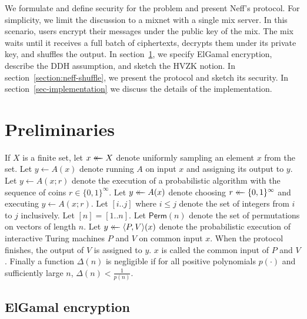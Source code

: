\documentclass[letter]{article}
\newcommand{\bits}{\{0,1\}}
\newcommand{\getsr}{\mathrel{\leftarrow\mkern-14mu\leftarrow}}
\newcommand{\brackets}[1]{\langle #1 \rangle}
\newcommand{\Perm}{\textsf{Perm}}
\begin{document}
We formulate and define security for the problem and present Neff's protocol.
For simplicity, we limit the discussion to a mixnet with a single mix server. In
this scenario, users encrypt their messages under the public key of the mix. The
mix waits until it receives a full batch of ciphertexts, decrypts them under its
private key, and shuffles the output. In section~\ref{section:prelim}, we specify
ElGamal encryption, describe the DDH assumption, and sketch the HVZK notion. In
section~\ref{section:neff-shuffle}, we present the protocol and sketch its
security. In section~\ref{sec-implementation} we discuss the details of the
implementation.

\section{Preliminaries} \label{section:prelim}

If $X$ is a finite set, let $x \getsr X$ denote uniformly sampling an
element $x$ from the set. Let $y \gets A(x)$ denote running $A$ on input $x$ and
assigning its output to $y$. Let $y \gets A(x; r)$ denote the execution of a
probabilistic algorithm with the sequence of coins $r \in \bits^\infty$. Let $y
\getsr A(x)$ denote choosing $r \getsr \bits^\infty$ and executing $y \gets
A(x; r)$. Let $[i..j]$ where $i \le j$ denote the set of integers from $i$ to
$j$ inclusively.
Let $[n] = [1..n]$.
Let $\Perm(n)$ denote the set of permutations on vectors of length $n$.
Let $y \getsr \brackets{P, V}(x)$ denote the probabilistic execution of
interactive Turing machines $P$ and $V$ on common input $x$. When the protocol
finishes, the output of $V$ is assigned to $y$.
$x$ is called the common input of $P$ and $V$.
Finally a function $\Delta(n)$ is
negligible if for all positive polynomials
$p(\cdot)$ and sufficiently large $n$, $\Delta(n) < \frac{1}{p(n)}$.


\subsection{ElGamal encryption}
\end{document}
